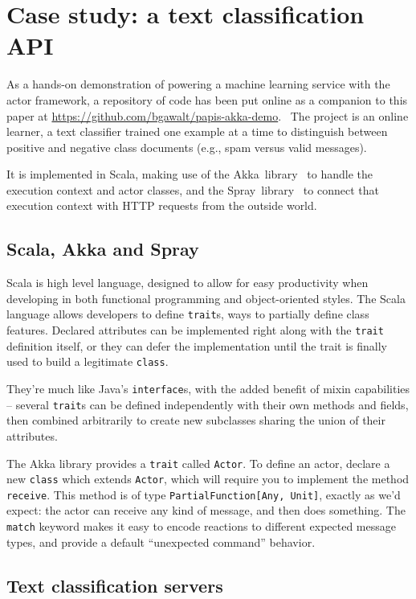 \documentclass{article}
\begin{document}
\section{Case study: a text classification API}

As a hands-on demonstration of powering a machine learning service with
the actor framework, a repository of code has been put online as a companion 
to this paper at \url{https://github.com/bgawalt/papis-akka-demo}.~\cite{gawalt_papis_demo}
The project is an online learner, a text classifier trained one example at a time
to distinguish between positive and negative class documents (e.g., spam 
versus valid messages).

It is implemented in Scala, making use of the Akka~library~\cite{akka_doc}
to handle the execution context and actor classes, and the Spray~library~\cite{spray_doc}
to connect that execution context with HTTP requests from the outside world.

\subsection{Scala, Akka and Spray}

Scala is high level language, designed to allow for easy productivity when
developing in both functional programming and object-oriented styles. The
Scala language allows developers to define \texttt{trait}s, ways to partially 
define class features. Declared attributes can be implemented right
along with the \texttt{trait} definition itself, or they can defer the implementation
until the trait is finally used to build a legitimate \texttt{class}.

They're much like Java's \texttt{interface}s, with the added benefit of mixin 
capabilities -- several \texttt{trait}s can be defined independently with their own
 methods and fields, then combined arbitrarily to create new subclasses sharing
 the union of their attributes.

The Akka library provides a \texttt{trait} called \texttt{Actor}. To define an actor, 
declare a new \texttt{class} which extends \texttt{Actor}, which will require you to
implement the method \texttt{receive}. This method is of type \texttt{PartialFunction[Any,~Unit]},
exactly as we'd expect: the actor can receive any kind of message, and then does 
something. The \texttt{match} keyword makes it easy to encode reactions to different
expected message types, and provide a default ``unexpected command'' behavior.

\subsection{Text classification servers}
\end{document}
